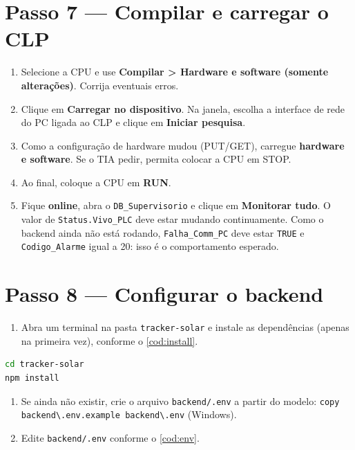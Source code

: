 \documentclass[12pt, oneside, a4paper, chapter=TITLE, section=TITLE, english, brazil]{abntex2}
\begin{document}
\chapter{Passo 7 --- Compilar e carregar o CLP}

\begin{enumerate}[label=\arabic*.]
  \item Selecione a CPU e use \textbf{Compilar > Hardware e software (somente alterações)}. Corrija eventuais erros.
  \item Clique em \textbf{Carregar no dispositivo}. Na janela, escolha a interface de rede do PC ligada ao CLP e clique em \textbf{Iniciar pesquisa}.
  \item Como a configuração de hardware mudou (PUT/GET), carregue \textbf{hardware e software}. Se o TIA pedir, permita colocar a CPU em STOP.
  \item Ao final, coloque a CPU em \textbf{RUN}.
  \item Fique \textbf{online}, abra o \texttt{DB\_Supervisorio} e clique em \textbf{Monitorar tudo}. O valor de \texttt{Status.Vivo\_PLC} deve estar mudando continuamente. Como o backend ainda não está rodando, \texttt{Falha\_Comm\_PC} deve estar \texttt{TRUE} e \texttt{Codigo\_Alarme} igual a 20: isso é o comportamento esperado.
\end{enumerate}

\chapter{Passo 8 --- Configurar o backend}\label{cap:backend}

\begin{enumerate}[label=\arabic*.]
  \item Abra um terminal na pasta \texttt{tracker-solar} e instale as dependências (apenas na primeira vez), conforme o \autoref{cod:install}.
\end{enumerate}

\begin{lstlisting}[language=bash, caption={Instalação das dependências}, label={cod:install}]
cd tracker-solar
npm install
\end{lstlisting}

\begin{enumerate}[label=\arabic*., resume]
  \item Se ainda não existir, crie o arquivo \texttt{backend/.env} a partir do modelo: \texttt{copy backend\textbackslash.env.example backend\textbackslash.env} (Windows).
  \item Edite \texttt{backend/.env} conforme o \autoref{cod:env}.
\end{enumerate}
\end{document}
